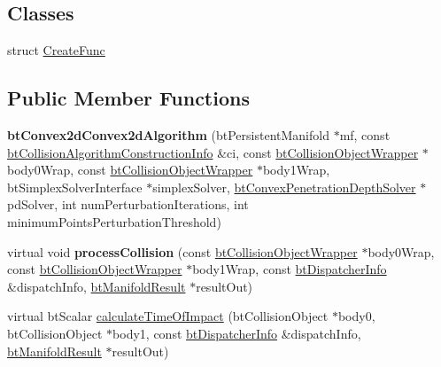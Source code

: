 \subsection*{Classes}
\begin{DoxyCompactItemize}
\item 
struct \hyperlink{structbtConvex2dConvex2dAlgorithm_1_1CreateFunc}{Create\+Func}
\end{DoxyCompactItemize}
\subsection*{Public Member Functions}
\begin{DoxyCompactItemize}
\item 
\mbox{\label{classbtConvex2dConvex2dAlgorithm_a5b8333581357811e17db88aa7380a315}} 
{\bfseries bt\+Convex2d\+Convex2d\+Algorithm} (bt\+Persistent\+Manifold $\ast$mf, const \hyperlink{structbtCollisionAlgorithmConstructionInfo}{bt\+Collision\+Algorithm\+Construction\+Info} \&ci, const \hyperlink{structbtCollisionObjectWrapper}{bt\+Collision\+Object\+Wrapper} $\ast$body0\+Wrap, const \hyperlink{structbtCollisionObjectWrapper}{bt\+Collision\+Object\+Wrapper} $\ast$body1\+Wrap, bt\+Simplex\+Solver\+Interface $\ast$simplex\+Solver, \hyperlink{classbtConvexPenetrationDepthSolver}{bt\+Convex\+Penetration\+Depth\+Solver} $\ast$pd\+Solver, int num\+Perturbation\+Iterations, int minimum\+Points\+Perturbation\+Threshold)
\item 
\mbox{\label{classbtConvex2dConvex2dAlgorithm_af74b6cf73f857abc2aa6eca44be799e3}} 
virtual void {\bfseries process\+Collision} (const \hyperlink{structbtCollisionObjectWrapper}{bt\+Collision\+Object\+Wrapper} $\ast$body0\+Wrap, const \hyperlink{structbtCollisionObjectWrapper}{bt\+Collision\+Object\+Wrapper} $\ast$body1\+Wrap, const \hyperlink{structbtDispatcherInfo}{bt\+Dispatcher\+Info} \&dispatch\+Info, \hyperlink{classbtManifoldResult}{bt\+Manifold\+Result} $\ast$result\+Out)
\item 
virtual bt\+Scalar \hyperlink{classbtConvex2dConvex2dAlgorithm_a32bf85e0246ed54dd41edd861294c37e}{calculate\+Time\+Of\+Impact} (bt\+Collision\+Object $\ast$body0, bt\+Collision\+Object $\ast$body1, const \hyperlink{structbtDispatcherInfo}{bt\+Dispatcher\+Info} \&dispatch\+Info, \hyperlink{classbtManifoldResult}{bt\+Manifold\+Result} $\ast$result\+Out)
\item 

\end{DoxyCompactItemize}
